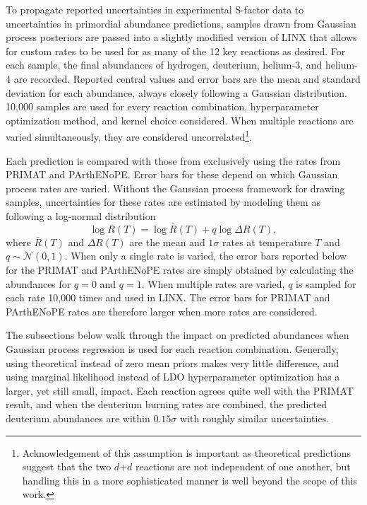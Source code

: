 \documentclass[%
 reprint,
superscriptaddress,
nofootinbib,
 amsmath,amssymb,
 aps,
 pra,
]{revtex4-2}
\begin{document}
To propagate reported uncertainties in experimental S-factor data to uncertainties in primordial abundance predictions, samples drawn from Gaussian process posteriors are passed into a slightly modified version of LINX that allows for custom rates to be used for as many of the 12 key reactions as desired. For each sample, the final abundances of hydrogen, deuterium, helium-3, and helium-4 are recorded. Reported central values and error bars are the mean and standard deviation for each abundance, always closely following a Gaussian distribution. 10,000 samples are used for every reaction combination, hyperparameter optimization method, and kernel choice considered. When multiple reactions are varied simultaneously, they are considered uncorrelated\footnote{Acknowledgement of this assumption is important as theoretical predictions suggest that the two $d$+$d$ reactions are not independent of one another, but handling this in a more sophisticated manner is well beyond the scope of this work.}. 

Each prediction is compared with those from exclusively using the rates from PRIMAT and PArthENoPE. Error bars for these depend on which Gaussian process rates are varied. Without the Gaussian process framework for drawing samples, uncertainties for these rates are estimated by modeling them as following a log-normal distribution
\begin{equation}
	\log R(T) = \log \bar{R}(T) + q \log \Delta R(T), \nonumber
\end{equation}
where $\bar{R}(T)$ and $\Delta R(T)$ are the mean and $1\sigma$ rates at temperature $T$ and $q\sim\mathcal{N}(0,1)$. When only a single rate is varied, the error bars reported below for the PRIMAT and PArthENoPE rates are simply obtained by calculating the abundances for $q=0$ and $q=1$. When multiple rates are varied, $q$ is sampled for each rate 10,000 times and used in LINX. The error bars for PRIMAT and PArthENoPE rates are therefore larger when more rates are considered. 

The subsections below walk through the impact on predicted abundances when Gaussian process regression is used for each reaction combination. Generally, using theoretical instead of zero mean priors makes very little difference, and using marginal likelihood instead of LDO hyperparameter optimization has a larger, yet still small, impact. Each reaction agrees quite well with the PRIMAT result, and when the deuterium burning rates are combined, the predicted deuterium abundances are within $0.15\sigma$ with roughly similar uncertainties.
\end{document}
